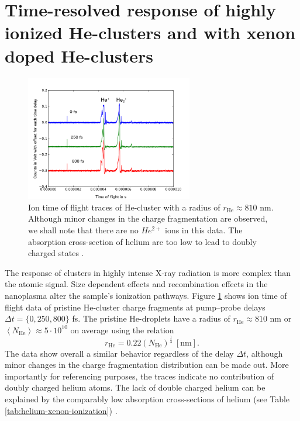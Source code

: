 \section[Time-resolved response of highly ionized He- and HeXe-clusters]{Time-resolved response of highly ionized He-clusters and with xenon doped He-clusters}\label{sec:hexe--and-he-TOF}
\begin{figure}
	\centering
		\includegraphics[width=0.65\textwidth]{images/results/TOF-helium-cluster.png}
	\caption[Time-resolved answer of He-clusters in TOF spectroscopy.]{Ion time of flight traces of He-cluster with a radius of $r_{\text{He}}\approx 810$ nm. Although minor changes in the charge fragmentation are observed, we shall note that there are no $He^{2+}$ ions in this data. The absorption cross-section of helium are too low to lead to doubly charged states \citep{Ho-2016-PC}.}
	\label{fig:TOF-helium-cluster}
\end{figure}
The response of clusters in highly intense X-ray radiation is more complex than the atomic signal. Size dependent effects \citep{Schorb-2012-PRL,Schutte-2015-JPhysB} and recombination effects in the nanoplasma \citep{Schutte-2014-PRL} alter the sample's ionization pathways. Figure \ref{fig:TOF-helium-cluster} shows ion time of flight data of pristine He-cluster charge fragments at pump--probe delays $\Delta t=\{0, 250, 800\}$ fs. The pristine He-droplets have a radius of $r_{\text{He}}\approx 810$ nm or $\left\langle N_{\text{He}}\right\rangle\approx 5\cdot 10^{10}$ on average using the relation \citep{Gomez-2011-JCP}
\begin{equation}
r_{\text{He}}=0.22 (N_{\text{He}})^{\frac{1}{3}}\ [\text{nm}].
\end{equation}
The data show overall a similar behavior regardless of the delay $\Delta t$, although minor changes in the charge fragmentation distribution can be made out. More importantly for referencing purposes, the traces indicate no contribution of doubly charged helium atoms. The lack of double charged helium can be explained by the comparably low absorption cross-sections of helium (see Table \ref{tab:helium-xenon-ionization}) \citep{Ho-2016-PC}.\\
